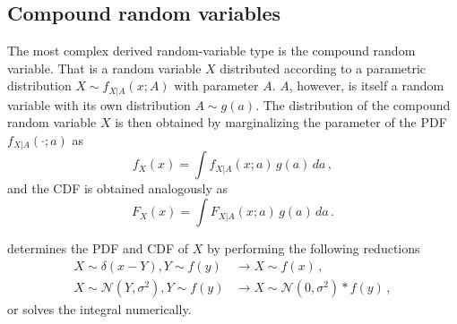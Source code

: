 \subsection{Compound random variables}
The most complex derived random-variable type is the compound random variable. That is a random variable
$X$ distributed according to a parametric distribution $X\sim f_{X|A}(x;A)$ with parameter $A$. $A$, however, 
is itself a random variable with its own distribution $A\sim g(a)$. The distribution of the compound 
random variable $X$ is then obtained by marginalizing the parameter of the PDF $f_{X|A}(\cdot;a)$ as 
\begin{equation}
 f_X(x) = \int f_{X|A}(x;a)\,g(a)\,da\,,\nonumber
\end{equation}
and the CDF is obtained analogously as
\begin{equation}
 F_X(x) = \int F_{X|A}(x;a)\,g(a)\,da\,.\nonumber
\end{equation}

 determines the PDF and CDF of $X$ by performing the following reductions
\begin{align}
 X\sim\delta(x-Y), Y\sim f(y) &\longrightarrow X \sim f(x)\,, \nonumber \\
 X\sim\mathcal{N}(Y,\sigma^2), Y\sim f(y) &\longrightarrow X \sim \mathcal{N}(0, \sigma^2) \ast f(y)\,, \nonumber
\end{align}
or solves the integral numerically.

